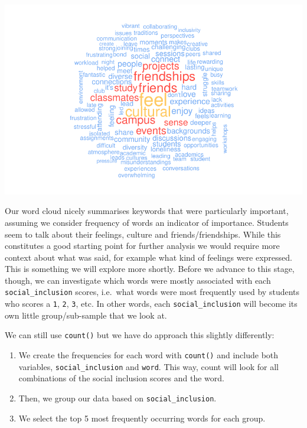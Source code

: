 \documentclass[
  letterpaper,
]{krantz}
\begin{document}
\includegraphics{14_mixed_methods_files/figure-pdf/wordcloud-plain-1.pdf}

Our word cloud nicely summarises keywords that were particularly
important, assuming we consider frequency of words an indicator of
importance. Students seem to talk about their feelings, culture and
friends/friendships. While this constitutes a good starting point for
further analysis we would require more context about what was said, for
example what kind of feelings were expressed. This is something we will
explore more shortly. Before we advance to this stage, though, we can
investigate which words were mostly associated with each
\texttt{social\_inclusion} scores, i.e.~what words were most frequently
used by students who scores a \texttt{1}, \texttt{2}, \texttt{3}, etc.
In other words, each \texttt{social\_inclusion} will become its own
little group/sub-sample that we look at.

We can still use \texttt{count()} but we have do approach this slightly
differently:

\begin{enumerate}
\def\labelenumi{\arabic{enumi}.}
\item
  We create the frequencies for each word with \texttt{count()} and
  include both variables, \texttt{social\_inclusion} and \texttt{word}.
  This way, count will look for all combinations of the social inclusion
  scores and the word.
\item
  Then, we group our data based on \texttt{social\_inclusion}.
\item
  We select the top 5 most frequently occurring words for each group.
\end{enumerate}
\end{document}
